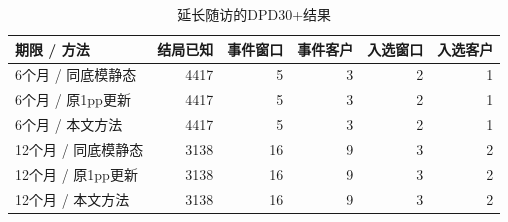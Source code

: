\begin{table}[H]\centering\caption{延长随访的DPD30+结果}
\fontsize{9bp}{12bp}\selectfont
\begin{tabularx}{\linewidth}{@{}Yrrrrr@{}}\toprule
期限 / 方法 & 结局已知 & 事件窗口 & 事件客户 & 入选窗口 & 入选客户\\\midrule
6个月 / 同底模静态 & 4417 & 5 & 3 & 2 & 1\\
6个月 / 原1pp更新 & 4417 & 5 & 3 & 2 & 1\\
6个月 / 本文方法 & 4417 & 5 & 3 & 2 & 1\\
12个月 / 同底模静态 & 3138 & 16 & 9 & 3 & 2\\
12个月 / 原1pp更新 & 3138 & 16 & 9 & 3 & 2\\
12个月 / 本文方法 & 3138 & 16 & 9 & 3 & 2\\
\bottomrule\end{tabularx}
\end{table}